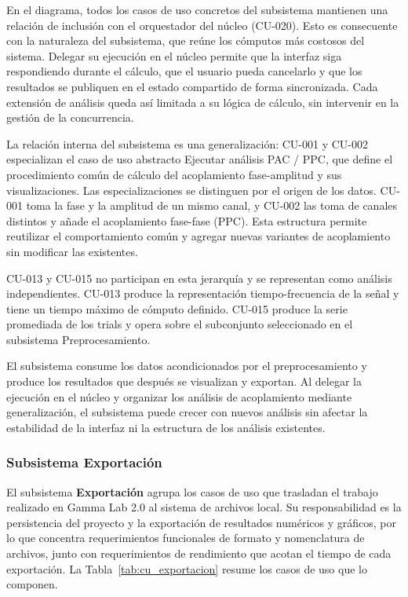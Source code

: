 \documentclass[11pt,a4paper]{article}
\DeclareRobustCommand{\_}{\textunderscore\allowbreak}
\begin{document}
En el diagrama, todos los casos de uso concretos del subsistema mantienen una relaci\'on de inclusi\'on con el orquestador del n\'ucleo (CU-020). Esto es consecuente con la naturaleza del subsistema, que re\'une los c\'omputos m\'as costosos del sistema. Delegar su ejecuci\'on en el n\'ucleo permite que la interfaz siga respondiendo durante el c\'alculo, que el usuario pueda cancelarlo y que los resultados se publiquen en el estado compartido de forma sincronizada. Cada extensi\'on de an\'alisis queda as\'i limitada a su l\'ogica de c\'alculo, sin intervenir en la gesti\'on de la concurrencia.

La relaci\'on interna del subsistema es una generalizaci\'on: CU-001 y CU-002 especializan el caso de uso abstracto Ejecutar an\'alisis PAC / PPC, que define el procedimiento com\'un de c\'alculo del acoplamiento fase-amplitud y sus visualizaciones. Las especializaciones se distinguen por el origen de los datos. CU-001 toma la fase y la amplitud de un mismo canal, y CU-002 las toma de canales distintos y a\~nade el acoplamiento fase-fase (PPC). Esta estructura permite reutilizar el comportamiento com\'un y agregar nuevas variantes de acoplamiento sin modificar las existentes.

CU-013 y CU-015 no participan en esta jerarqu\'ia y se representan como an\'alisis independientes. CU-013 produce la representaci\'on tiempo-frecuencia de la se\~nal y tiene un tiempo m\'aximo de c\'omputo definido. CU-015 produce la serie promediada de los trials y opera sobre el subconjunto seleccionado en el subsistema Preprocesamiento.

El subsistema consume los datos acondicionados por el preprocesamiento y produce los resultados que despu\'es se visualizan y exportan. Al delegar la ejecuci\'on en el n\'ucleo y organizar los an\'alisis de acoplamiento mediante generalizaci\'on, el subsistema puede crecer con nuevos an\'alisis sin afectar la estabilidad de la interfaz ni la estructura de los an\'alisis existentes.

\subsubsection{Subsistema Exportaci\'on}

El subsistema \textbf{Exportaci\'on} agrupa los casos de uso que trasladan el trabajo realizado en Gamma Lab 2.0 al sistema de archivos local. Su responsabilidad es la persistencia del proyecto y la exportaci\'on de resultados num\'ericos y gr\'aficos, por lo que concentra requerimientos funcionales de formato y nomenclatura de archivos, junto con requerimientos de rendimiento que acotan el tiempo de cada exportaci\'on. La Tabla~\ref{tab:cu_exportacion} resume los casos de uso que lo componen.
\end{document}

